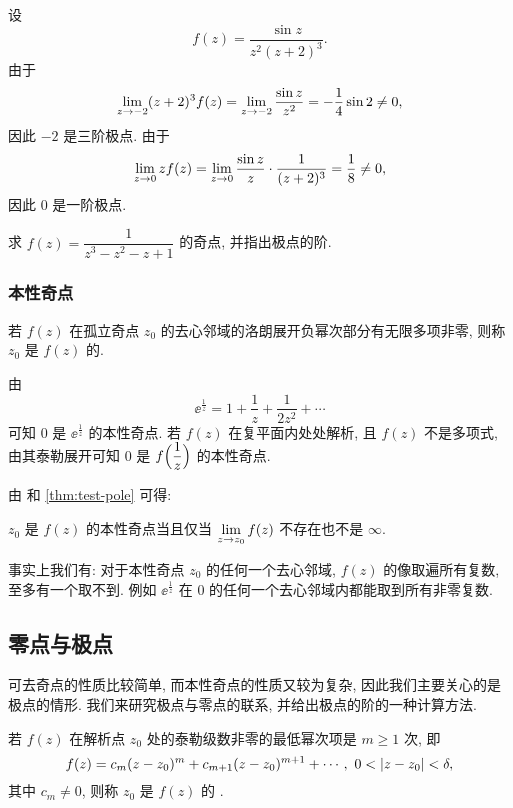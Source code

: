 \begin{example}
  设
  \[
    f(z)=\frac{\sin z}{z^2(z+2)^3}.
  \]
  由于
  \[
     \lim_{z\rightarrow -2}(z+2)^3f(z)
    =\lim_{z\rightarrow -2}\frac{\sin z}{z^2}
    =-\frac14\sin 2\neq0,
  \]
  因此 $-2$ 是三阶极点.
  由于
  \[
     \lim_{z\rightarrow 0}zf(z)
    =\lim_{z\rightarrow 0}\frac{\sin z}z\cdot\frac1{(z+2)^3}
    =\frac18\neq0,
  \]
  因此 $0$ 是一阶极点.
\end{example}

\begin{exercise}
  求 $f(z)=\dfrac1{z^3-z^2-z+1}$ 的奇点, 并指出极点的阶.
\end{exercise}


\subsubsection{本性奇点}

\begin{definition}
  若 $f(z)$ 在孤立奇点 $z_0$ 的去心邻域的洛朗展开负幂次部分有无限多项非零, 则称 $z_0$ 是 $f(z)$ 的.
\end{definition}

\begin{example}
  由
  \[
    \ee^{\frac1z}=1+\frac1z+\frac1{2z^2}+\cdots
  \]
  可知 $0$ 是 $\ee^{\frac1z}$ 的本性奇点.
  若 $f(z)$ 在复平面内处处解析, 且 $f(z)$ 不是多项式, 由其泰勒展开可知 $0$ 是 $f\Bigl(\dfrac1z\Bigr)$ 的本性奇点.
\end{example}

由 和 \ref{thm:test-pole} 可得:
\begin{theorem}
  $z_0$ 是 $f(z)$ 的本性奇点当且仅当 $\lim\limits_{z\rightarrow z_0}f(z)$ 不存在也不是 $\infty$.
\end{theorem}

事实上我们有: 对于本性奇点 $z_0$ 的任何一个去心邻域, $f(z)$ 的像取遍所有复数, 至多有一个取不到.
例如 $\ee^{\frac1z}$ 在 $0$ 的任何一个去心邻域内都能取到所有非零复数.


\subsection{零点与极点}

可去奇点的性质比较简单, 而本性奇点的性质又较为复杂, 因此我们主要关心的是极点的情形.
我们来研究极点与零点的联系, 并给出极点的阶的一种计算方法.

\begin{definition}
  \label{def:zero-order}
  若 $f(z)$ 在解析点 $z_0$ 处的泰勒级数非零的最低幂次项是 $m\ge1$ 次, 即
  \[
    f(z)=c_m(z-z_0)^m+c_{m+1}(z-z_0)^{m+1}+\cdots,\ 0<\abs{z-z_0}<\delta,
  \]
  其中 $c_m\neq 0$, 则称 $z_0$ 是 $f(z)$ 的 .\footnotemark
\end{definition}


